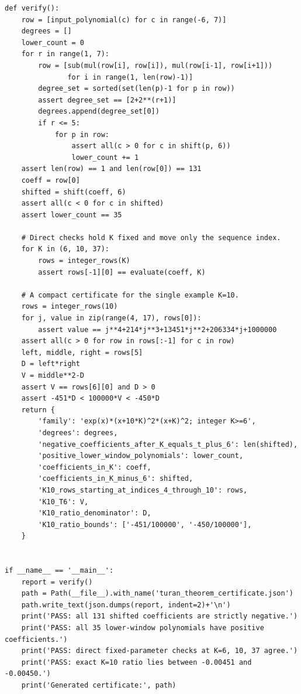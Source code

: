 \documentclass[11pt]{article}
\begin{document}
\begin{lstlisting}
def verify():
    row = [input_polynomial(c) for c in range(-6, 7)]
    degrees = []
    lower_count = 0
    for r in range(1, 7):
        row = [sub(mul(row[i], row[i]), mul(row[i-1], row[i+1]))
               for i in range(1, len(row)-1)]
        degree_set = sorted(set(len(p)-1 for p in row))
        assert degree_set == [2+2**(r+1)]
        degrees.append(degree_set[0])
        if r <= 5:
            for p in row:
                assert all(c > 0 for c in shift(p, 6))
                lower_count += 1
    assert len(row) == 1 and len(row[0]) == 131
    coeff = row[0]
    shifted = shift(coeff, 6)
    assert all(c < 0 for c in shifted)
    assert lower_count == 35

    # Direct checks hold K fixed and move only the sequence index.
    for K in (6, 10, 37):
        rows = integer_rows(K)
        assert rows[-1][0] == evaluate(coeff, K)

    # A compact certificate for the single example K=10.
    rows = integer_rows(10)
    for j, value in zip(range(4, 17), rows[0]):
        assert value == j**4+214*j**3+13451*j**2+206334*j+1000000
    assert all(c > 0 for row in rows[:-1] for c in row)
    left, middle, right = rows[5]
    D = left*right
    V = middle**2-D
    assert V == rows[6][0] and D > 0
    assert -451*D < 100000*V < -450*D
    return {
        'family': 'exp(x)*(x+10*K)^2*(x+K)^2; integer K>=6',
        'degrees': degrees,
        'negative_coefficients_after_K_equals_t_plus_6': len(shifted),
        'positive_lower_window_polynomials': lower_count,
        'coefficients_in_K': coeff,
        'coefficients_in_K_minus_6': shifted,
        'K10_rows_starting_at_indices_4_through_10': rows,
        'K10_T6': V,
        'K10_ratio_denominator': D,
        'K10_ratio_bounds': ['-451/100000', '-450/100000'],
    }


if __name__ == '__main__':
    report = verify()
    path = Path(__file__).with_name('turan_theorem_certificate.json')
    path.write_text(json.dumps(report, indent=2)+'\n')
    print('PASS: all 131 shifted coefficients are strictly negative.')
    print('PASS: all 35 lower-window polynomials have positive coefficients.')
    print('PASS: direct fixed-parameter checks at K=6, 10, 37 agree.')
    print('PASS: exact K=10 ratio lies between -0.00451 and -0.00450.')
    print('Generated certificate:', path)
\end{lstlisting}

\clearpage
\end{document}

